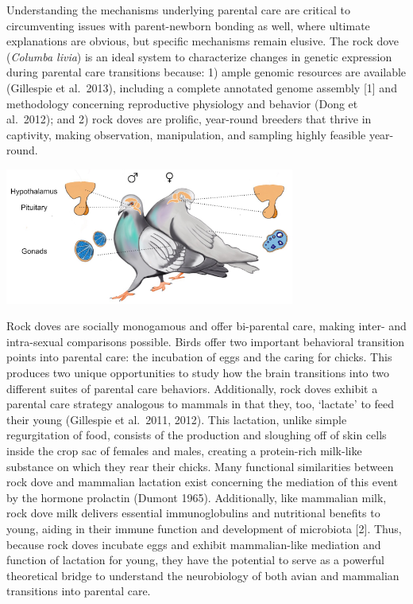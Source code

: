 \documentclass[10pt,letterpaper]{article}
\begin{document}
Understanding the mechanisms underlying parental care are critical to
circumventing issues with parent-newborn bonding as well, where ultimate
explanations are obvious, but specific mechanisms remain elusive. The
rock dove (\emph{Columba livia}) is an ideal system to characterize
changes in genetic expression during parental care transitions because:
1) ample genomic resources are available (Gillespie et al.~2013),
including a complete annotated genome assembly {[}1{]} and methodology
concerning reproductive physiology and behavior (Dong et al.~2012); and
2) rock doves are prolific, year-round breeders that thrive in
captivity, making observation, manipulation, and sampling highly
feasible year-round.

\includegraphics[width=360px]{../figures/images/PigeonHPGaxis}

Rock doves are socially monogamous and offer bi-parental care, making
inter- and intra-sexual comparisons possible. Birds offer two important
behavioral transition points into parental care: the incubation of eggs
and the caring for chicks. This produces two unique opportunities to
study how the brain transitions into two different suites of parental
care behaviors. Additionally, rock doves exhibit a parental care
strategy analogous to mammals in that they, too, `lactate' to feed their
young (Gillespie et al.~2011, 2012). This lactation, unlike simple
regurgitation of food, consists of the production and sloughing off of
skin cells inside the crop sac of females and males, creating a
protein-rich milk-like substance on which they rear their chicks. Many
functional similarities between rock dove and mammalian lactation exist
concerning the mediation of this event by the hormone prolactin (Dumont
1965). Additionally, like mammalian milk, rock dove milk delivers
essential immunoglobulins and nutritional benefits to young, aiding in
their immune function and development of microbiota {[}2{]}. Thus,
because rock doves incubate eggs and exhibit mammalian-like mediation
and function of lactation for young, they have the potential to serve as
a powerful theoretical bridge to understand the neurobiology of both
avian and mammalian transitions into parental care.
\end{document}
